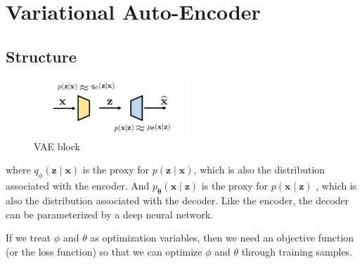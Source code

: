 \section{Variational Auto-Encoder}
\subsection{Structure}
\begin{figure}[H]
    \centering
    \includegraphics[width=0.5\textwidth]{./pics/VAE.png} %
    \caption{VAE block}
\end{figure}
where $q_{\phi}(\mathbf{z} \mid \mathbf{x})$ is the proxy for  $p(\mathbf{z} \mid \mathbf{x})$, which is also the distribution associated with the encoder.  
And $p_{\boldsymbol{\theta}}(\mathbf{x} \mid \mathbf{z})$ is the proxy for  $p(\mathbf{x} \mid \mathbf{z})$ , which is also the distribution associated with the decoder. 
Like the encoder, the decoder can be parameterized by a deep neural network. 

If we treat $\phi$ and $\theta$ as optimization variables, then we need an objective function (or the loss function) so that we can optimize $\phi$ and $\theta$ through training samples.
